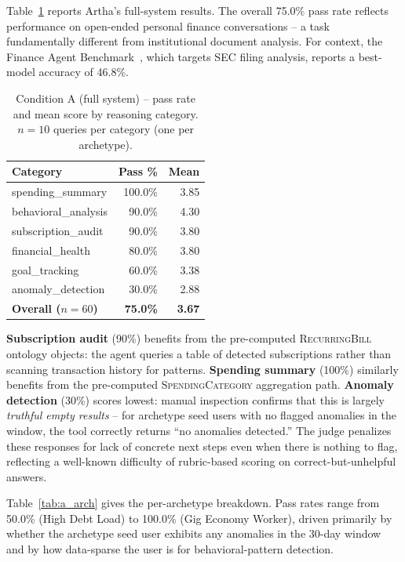 \documentclass[conference]{IEEEtran}
\begin{document}
Table~\ref{tab:a_cat} reports Artha's full-system results. The
overall 75.0\% pass rate reflects performance on open-ended personal
finance conversations -- a task fundamentally different from
institutional document analysis. For context, the Finance Agent
Benchmark~\cite{finance_agent_benchmark}, which targets SEC filing
analysis, reports a best-model accuracy of 46.8\%.

\begin{table}[t]
\centering
\caption{Condition A (full system) -- pass rate and mean score by
reasoning category. $n=10$ queries per category (one per
archetype).}
\label{tab:a_cat}
\begin{tabular}{@{}lrr@{}}
\toprule
Category & Pass \% & Mean \\
\midrule
spending\_summary & 100.0\% & 3.85 \\
behavioral\_analysis & 90.0\% & 4.30 \\
subscription\_audit & 90.0\% & 3.80 \\
financial\_health & 80.0\% & 3.80 \\
goal\_tracking & 60.0\% & 3.38 \\
anomaly\_detection & 30.0\% & 2.88 \\
\midrule
\textbf{Overall ($n=60$)} & \textbf{75.0\%} & \textbf{3.67} \\
\bottomrule
\end{tabular}
\end{table}

\textbf{Subscription audit} (90\%) benefits from the pre-computed
\textsc{RecurringBill} ontology objects: the agent queries a table
of detected subscriptions rather than scanning transaction history
for patterns. \textbf{Spending summary} (100\%) similarly benefits
from the pre-computed \textsc{SpendingCategory} aggregation path.
\textbf{Anomaly detection} (30\%) scores lowest: manual inspection
confirms that this is largely \emph{truthful empty results} -- for
archetype seed users with no flagged anomalies in the window, the
tool correctly returns ``no anomalies detected.'' The judge
penalizes these responses for lack of concrete next steps even when
there is nothing to flag, reflecting a well-known difficulty of
rubric-based scoring on correct-but-unhelpful answers.

Table~\ref{tab:a_arch} gives the per-archetype breakdown. Pass
rates range from 50.0\% (High Debt Load) to 100.0\% (Gig Economy
Worker), driven primarily by whether the archetype seed user
exhibits any anomalies in the 30-day window and by how
data-sparse the user is for behavioral-pattern detection.
\end{document}
